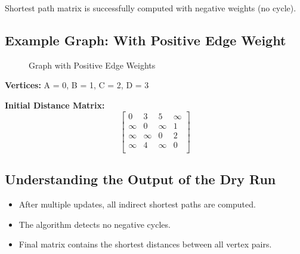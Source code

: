 \documentclass[14pt,a4paper]{extarticle}
\begin{document}
\begin{tcolorbox}[colback=white, colframe=black, title=Final Result (Negative Edge)]
Shortest path matrix is successfully computed with negative weights (no cycle).
\end{tcolorbox}

\newpage
\subsection{Example Graph: With Positive Edge Weight}
\begin{figure}[H]
\centering
{}
\caption{Graph with Positive Edge Weights}
\end{figure}

\textbf{Vertices:} A = 0, B = 1, C = 2, D = 3

\textbf{Initial Distance Matrix:}
\[
\begin{bmatrix}
0 & 3 & 5 & \infty \\
\infty & 0 & \infty & 1 \\
\infty & \infty & 0 & 2 \\
\infty & 4 & \infty & 0 \\
\end{bmatrix}
\]

\subsection{Understanding the Output of the Dry Run}

\begin{itemize}
    \item After multiple updates, all indirect shortest paths are computed.
    \item The algorithm detects no negative cycles.
    \item Final matrix contains the shortest distances between all vertex pairs.
\end{itemize}
\end{document}
